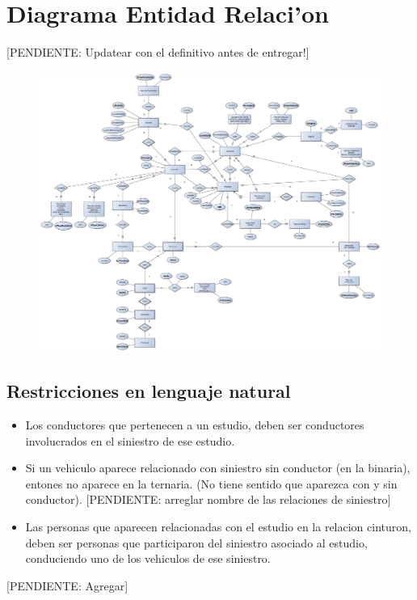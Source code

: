 \section{Diagrama Entidad Relaci'on}

[PENDIENTE: Updatear con el definitivo antes de entregar!]

\begin{figure}[H]
	\begin{center}
		\includegraphics[scale=0.2]{imagenes/DER.pdf}
	\end{center}
\end{figure}

\subsection{Restricciones en lenguaje natural}

\begin{itemize}
\item Los conductores que pertenecen a un estudio, deben ser conductores involucrados en el siniestro de ese estudio.
\item Si un vehiculo aparece relacionado con siniestro sin conductor (en la binaria), entones no aparece en la ternaria. (No tiene sentido que aparezca con y sin conductor). [PENDIENTE: arreglar nombre de las relaciones de siniestro]
\item Las personas que aparecen relacionadas con el estudio en la relacion cinturon, deben ser personas que participaron del siniestro asociado al estudio, conduciendo uno de los vehiculos de ese siniestro.
\end{itemize}

[PENDIENTE: Agregar]